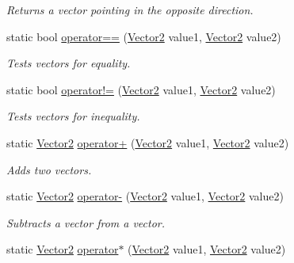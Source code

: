 \begin{DoxyCompactItemize}
\begin{DoxyCompactList}\small\item\em Returns a vector pointing in the opposite direction.\end{DoxyCompactList}\item 
static bool \hyperlink{struct_microsoft_1_1_xna_1_1_framework_1_1_vector2_a473aaaa26a7e95cea2133244bf1b57a3}{operator==} (\hyperlink{struct_microsoft_1_1_xna_1_1_framework_1_1_vector2}{Vector2} value1, \hyperlink{struct_microsoft_1_1_xna_1_1_framework_1_1_vector2}{Vector2} value2)
\begin{DoxyCompactList}\small\item\em Tests vectors for equality.\end{DoxyCompactList}\item 
static bool \hyperlink{struct_microsoft_1_1_xna_1_1_framework_1_1_vector2_a63e86ed828f9f0af032435fc21223f0e}{operator!=} (\hyperlink{struct_microsoft_1_1_xna_1_1_framework_1_1_vector2}{Vector2} value1, \hyperlink{struct_microsoft_1_1_xna_1_1_framework_1_1_vector2}{Vector2} value2)
\begin{DoxyCompactList}\small\item\em Tests vectors for inequality.\end{DoxyCompactList}\item 
static \hyperlink{struct_microsoft_1_1_xna_1_1_framework_1_1_vector2}{Vector2} \hyperlink{struct_microsoft_1_1_xna_1_1_framework_1_1_vector2_abac1c36ab19d8cf569b230b362947c1f}{operator+} (\hyperlink{struct_microsoft_1_1_xna_1_1_framework_1_1_vector2}{Vector2} value1, \hyperlink{struct_microsoft_1_1_xna_1_1_framework_1_1_vector2}{Vector2} value2)
\begin{DoxyCompactList}\small\item\em Adds two vectors.\end{DoxyCompactList}\item 
static \hyperlink{struct_microsoft_1_1_xna_1_1_framework_1_1_vector2}{Vector2} \hyperlink{struct_microsoft_1_1_xna_1_1_framework_1_1_vector2_ac2a2d0046508818743472e4bc0c70d03}{operator-\/} (\hyperlink{struct_microsoft_1_1_xna_1_1_framework_1_1_vector2}{Vector2} value1, \hyperlink{struct_microsoft_1_1_xna_1_1_framework_1_1_vector2}{Vector2} value2)
\begin{DoxyCompactList}\small\item\em Subtracts a vector from a vector.\end{DoxyCompactList}\item 
static \hyperlink{struct_microsoft_1_1_xna_1_1_framework_1_1_vector2}{Vector2} \hyperlink{struct_microsoft_1_1_xna_1_1_framework_1_1_vector2_a16b3751065ee46e45481925944996688}{operator$\ast$} (\hyperlink{struct_microsoft_1_1_xna_1_1_framework_1_1_vector2}{Vector2} value1, \hyperlink{struct_microsoft_1_1_xna_1_1_framework_1_1_vector2}{Vector2} value2)

\end{DoxyCompactItemize}
